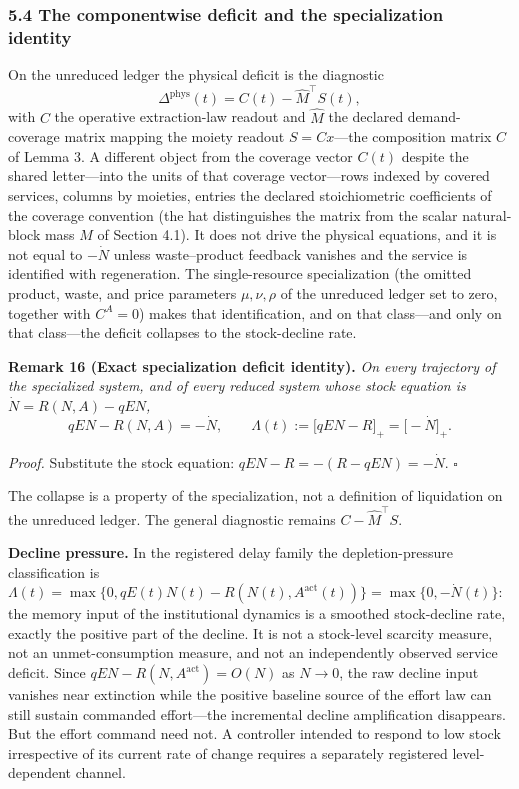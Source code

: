 \documentclass[11pt]{article}
\begin{document}
\subsubsection{5.4 The componentwise deficit and the specialization
identity}\label{the-componentwise-deficit-and-the-specialization-identity}

On the unreduced ledger the physical deficit is the diagnostic \[\Delta^{\mathrm{phys}}(t) = C(t) - \widehat{M}^\top S(t),\] with \(C\) the operative extraction-law readout and \(\widehat{M}\) the declared demand-coverage matrix mapping the moiety readout \(S = Cx\)---the composition matrix \(C\) of Lemma 3. A different object from the coverage vector \(C(t)\) despite the shared letter---into the units of that coverage vector---rows indexed by covered services, columns by moieties, entries the declared stoichiometric coefficients of the coverage convention (the hat distinguishes the matrix from the scalar natural-block mass \(M\) of Section 4.1). It does not drive the physical equations, and it is not equal to \(-\dot N\) unless waste--product feedback vanishes and the service is identified with regeneration. The single-resource specialization (the omitted product, waste, and price parameters \(\mu, \nu, \rho\) of the unreduced ledger set to zero, together with \(C^A = 0\)) makes that identification, and on that class---and only on that class---the deficit collapses to the stock-decline rate.

\textbf{Remark 16 (Exact specialization deficit identity).} \emph{On
every trajectory of the specialized system, and of every reduced system
whose stock equation is \(\dot N = R(N,A) - qEN\),}
\[qEN - R(N,A) = -\dot N, \qquad \Lambda(t) := \bigl[ qEN - R \bigr]_+ = \bigl[ -\dot N \bigr]_+.\]

\emph{Proof.} Substitute the stock equation:
\(qEN - R = -(R - qEN) = -\dot N\). \ensuremath{\square}

The collapse is a property of the specialization, not a definition of liquidation on the unreduced ledger. The general diagnostic remains \(C - \widehat{M}^\top S\).

\textbf{Decline pressure.} In the registered delay family the depletion-pressure classification is \(\Lambda(t) = \max\{0, qE(t)N(t) - R(N(t), A^{\mathrm{act}}(t))\} = \max\{0, -\dot N(t)\}\): the memory input of the institutional dynamics is a smoothed stock-decline rate, exactly the positive part of the decline. It is not a stock-level scarcity measure, not an unmet-consumption measure, and not an independently observed service deficit. Since \(qEN - R(N, A^{\mathrm{act}}) = O(N)\) as \(N \to 0\), the raw decline input vanishes near extinction while the positive baseline source of the effort law can still sustain commanded effort---the incremental decline amplification disappears. But the effort command need not. A controller intended to respond to low stock irrespective of its current rate of change requires a separately registered level-dependent channel.
\end{document}
